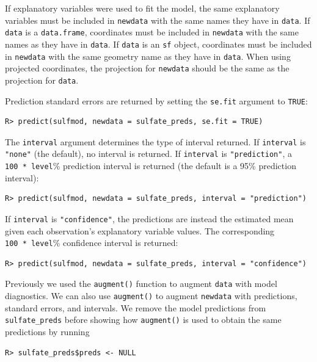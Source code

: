 \documentclass{article}
\begin{document}
If explanatory variables were used to fit the model, the same
explanatory variables must be included in \texttt{newdata} with the same
names they have in \texttt{data}. If \texttt{data} is a
\texttt{data.frame}, coordinates must be included in \texttt{newdata}
with the same names as they have in \texttt{data}. If \texttt{data} is
an \texttt{sf} object, coordinates must be included in \texttt{newdata}
with the same geometry name as they have in \texttt{data}. When using
projected coordinates, the projection for \texttt{newdata} should be the
same as the projection for \texttt{data}.

Prediction standard errors are returned by setting the \texttt{se.fit}
argument to \texttt{TRUE}:

\begin{verbatim}
R> predict(sulfmod, newdata = sulfate_preds, se.fit = TRUE)
\end{verbatim}

The \texttt{interval} argument determines the type of interval returned.
If \texttt{interval} is \texttt{"none"} (the default), no interval is
returned. If \texttt{interval} is \texttt{"prediction"}, a
\texttt{100\ *\ level}\% prediction interval is returned (the default is
a 95\% prediction interval):

\begin{verbatim}
R> predict(sulfmod, newdata = sulfate_preds, interval = "prediction")
\end{verbatim}

If \texttt{interval} is \texttt{"confidence"}, the predictions are
instead the estimated mean given each observation's explanatory variable
values. The corresponding \texttt{100\ *\ level}\% confidence interval
is returned:

\begin{verbatim}
R> predict(sulfmod, newdata = sulfate_preds, interval = "confidence")
\end{verbatim}

Previously we used the \texttt{augment()} function to augment
\texttt{data} with model diagnostics. We can also use \texttt{augment()}
to augment \texttt{newdata} with predictions, standard errors, and
intervals. We remove the model predictions from \texttt{sulfate\_preds}
before showing how \texttt{augment()} is used to obtain the same
predictions by running

\begin{verbatim}
R> sulfate_preds$preds <- NULL
\end{verbatim}
\end{document}

